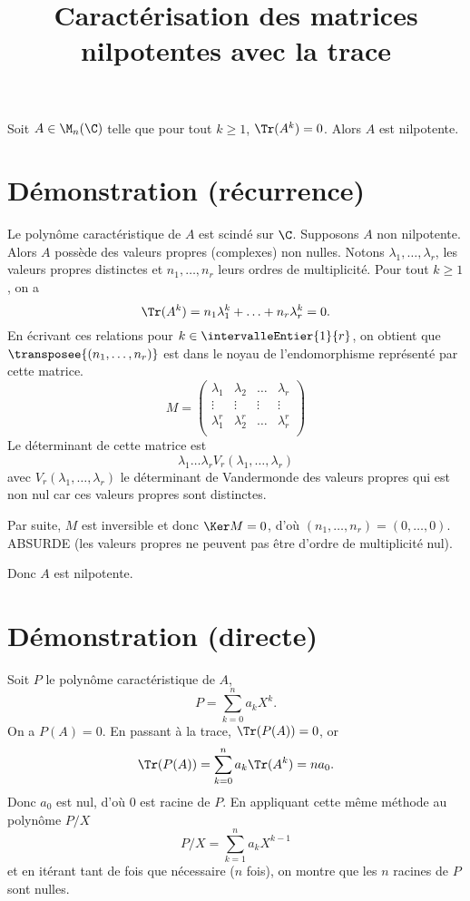 \documentclass[fontsize=12pt,twoside=false,parskip=half]{scrartcl}
\title{Caractérisation des matrices nilpotentes avec la trace}
\date{}
\author{}
\begin{document}
\maketitle
   \begin{Theoreme}
      Soit $A \in \M_n(\C)$ telle que pour tout $k \geq 1$, $\Tr(A^k) = 0$. Alors $A$ est nilpotente.
   \end{Theoreme}
   \section{Démonstration (récurrence)}
      Le polynôme caractéristique de $A$ est scindé sur $\C$. Supposons $A$ non nilpotente.
      Alors $A$ possède des valeurs propres (complexes) non nulles. Notons $\lambda_1, \ldots, \lambda_r$, 
      les valeurs propres distinctes et $n_1, \ldots, n_r$ leurs ordres de multiplicité.
      Pour tout $k \geq 1$, on a
      \[
         \Tr(A^k) = n_1 \lambda_1^k + \ldots + n_r \lambda_r^k = 0.
      \]
      En écrivant ces relations pour $k \in \intervalleEntier{1}{r}$, on obtient que $\transposee{(n_1, \ldots, n_r)}$
      est dans le noyau de l’endomorphisme représenté par cette matrice.
      \[M = \begin{pmatrix}
         \lambda_1   & \lambda_2 & \ldots  & \lambda_r   \\
         \vdots      & \vdots & \vdots  & \vdots      \\
         \lambda_1^r & \lambda_2^r & \ldots  & \lambda_r^r \\  
      \end{pmatrix}\]
      Le déterminant de cette matrice est  
      \[
         \lambda_1 \ldots \lambda_r V_r(\lambda_1, \ldots, \lambda_r)
      \]
      avec $V_r(\lambda_1, \ldots, \lambda_r)$ le déterminant de Vandermonde des valeurs propres qui est non nul 
      car ces valeurs propres sont distinctes.
      
      Par suite, $M$ est inversible et donc $\Ker M = {0}$, d’où $(n_1, \ldots, n_r) = (0, \ldots, 0)$.
      ABSURDE (les valeurs propres ne peuvent pas être d’ordre de multiplicité nul). 
      
      Donc $A$ est nilpotente.
      \section{Démonstration (directe)}
         Soit $P$ le polynôme caractéristique de $A$,
         \[
            P = \sum_{k = 0}^n a_k X^k.
         \]
         On a $P(A) = 0$. En passant à la trace, $\Tr(P(A)) = 0$, or
         \[
            \Tr(P(A)) = \sum_{k = 0}^n a_k \Tr(A^k) = na_0.
         \]
         Donc $a_0$ est nul, d’où $0$ est racine de $P$. En appliquant cette même méthode au polynôme $P/X$ 
         \[
            P/X = \sum_{k = 1}^n a_k X^{k-1}
         \]
         et en itérant tant de fois que nécessaire ($n$ fois), on montre que les $n$ racines de $P$ sont nulles.
\end{document}
